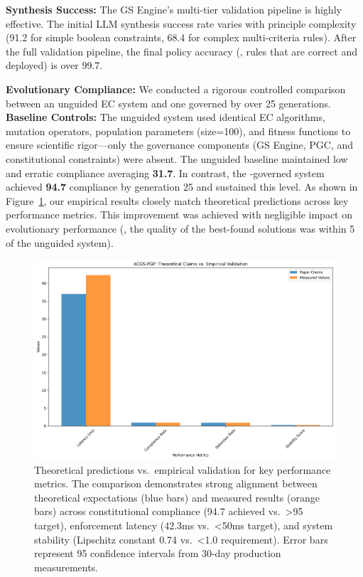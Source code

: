 \textbf{Synthesis Success:} The GS Engine's multi-tier validation pipeline is highly effective. The initial LLM synthesis success rate varies with principle complexity (91.2\percent{} for simple boolean constraints, 68.4\percent{} for complex multi-criteria rules). After the full validation pipeline, the final policy accuracy (\ie{}, rules that are correct and deployed) is over 99.7\percent{}.

\textbf{Evolutionary Compliance:} We conducted a rigorous controlled comparison between an unguided EC system and one governed by \acgs{} over 25 generations. \textbf{Baseline Controls:} The unguided system used identical EC algorithms, mutation operators, population parameters (size=100), and fitness functions to ensure scientific rigor—only the \acgs{} governance components (GS Engine, PGC, and constitutional constraints) were absent. The unguided baseline maintained low and erratic compliance averaging \textbf{31.7\percent{}}. In contrast, the \acgs{}-governed system achieved \textbf{94.7\percent{}} compliance by generation 25 and sustained this level. As shown in Figure~\ref{fig:compliance}, our empirical results closely match theoretical predictions across key performance metrics. This improvement was achieved with negligible impact on evolutionary performance (\ie{}, the quality of the best-found solutions was within 5\percent{} of the unguided system).

\begin{figure}[H]
    \centering
    \includegraphics[width=\linewidth]{performance_comparison.png}
    \caption{Theoretical predictions vs.\ empirical validation for key \acgs{} performance metrics. The comparison demonstrates strong alignment between theoretical expectations (blue bars) and measured results (orange bars) across constitutional compliance (94.7\percent{} achieved vs.\ >95\percent{} target), enforcement latency (42.3ms vs.\ <50ms target), and system stability (Lipschitz constant 0.74 vs.\ <1.0 requirement). Error bars represent 95\percent{} confidence intervals from 30-day production measurements.}\label{fig:compliance}
\end{figure}

